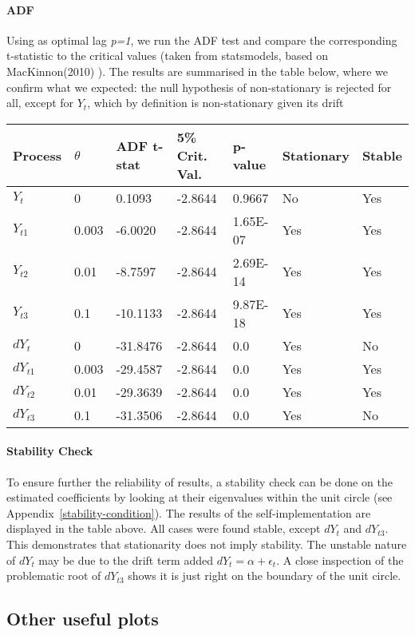 \documentclass[11pt]{article}
\begin{document}
    \paragraph{ADF}\label{adf}
    
Using as optimal lag \emph{p=1}, we run the ADF test and compare the
corresponding t-statistic to the critical values (taken from
statsmodels, based on
MacKinnon(2010) \cite{MacKinnon(2010)}). The results are summarised in the table below, where we confirm what we expected: the null hypothesis of non-stationary is rejected for all, except for $Y_t$, which by definition is non-stationary given its drift
    \begin{longtable}[]{@{}lllllll@{}}
\toprule
Process & $\theta$ & ADF t-stat & 5\% Crit. Val. & p-value & Stationary & Stable\tabularnewline
\midrule
\endhead
$Y_{t}$ & 0 & 0.1093 & -2.8644 & 0.9667 & No & Yes\tabularnewline
$Y_{t1}$ & 0.003 & -6.0020 & -2.8644 & 1.65E-07 & Yes & Yes\tabularnewline
$Y_{t2}$ & 0.01 & -8.7597 & -2.8644 & 2.69E-14 & Yes & Yes\tabularnewline
$Y_{t3}$ & 0.1 & -10.1133 & -2.8644 & 9.87E-18 & Yes & Yes\tabularnewline
$dY_{t}$ & 0 & -31.8476 & -2.8644 & 0.0 & Yes & No\tabularnewline
$dY_{t1}$ & 0.003 & -29.4587 & -2.8644 & 0.0 & Yes & Yes\tabularnewline
$dY_{t2}$ & 0.01 & -29.3639 & -2.8644 & 0.0 & Yes & Yes\tabularnewline
$dY_{t3}$ & 0.1 & -31.3506 & -2.8644 & 0.0 & Yes & No\tabularnewline
\bottomrule
\end{longtable}
    \paragraph{Stability Check}\label{stability-check}
To ensure further the reliability of results, a stability check can be
done on the estimated coefficients by looking at their eigenvalues
within the unit circle (see Appendix~\ref{stability-condition}). The results of the
self-implementation are displayed in the table above. All cases were
found stable, except $dY_{t}$ and $dY_{t3}$. This demonstrates that
stationarity does not imply stability. The unstable nature of $dY_{t}$ may
be due to the drift term added \(dY_t = \alpha + \epsilon_t\). A close
inspection of the problematic root of $dY_{t3}$ shows it is just right on
the boundary of the unit circle.

    \subsection{Other useful plots}\label{other-useful-plots}
    
\end{document}
